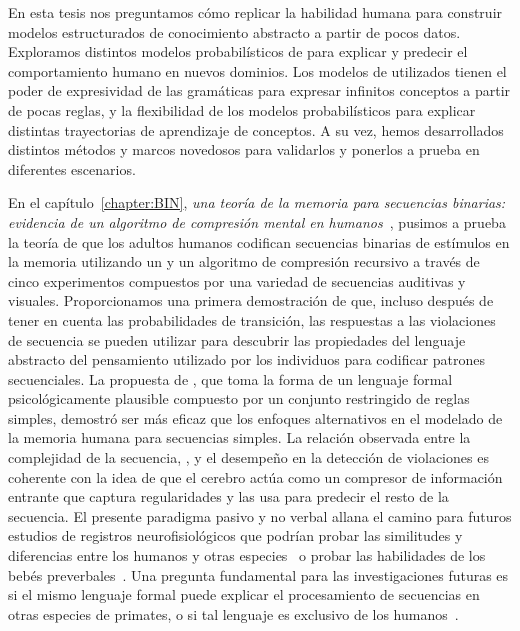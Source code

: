 
En esta tesis nos preguntamos cómo replicar la habilidad humana para construir modelos estructurados de conocimiento abstracto a partir de pocos datos. Exploramos distintos modelos probabilísticos de \lot para explicar y predecir el comportamiento humano en nuevos dominios. Los modelos de \lot utilizados tienen el poder de expresividad de las gramáticas para expresar infinitos conceptos a partir de pocas reglas, y la flexibilidad de los modelos probabilísticos para explicar distintas trayectorias de aprendizaje de conceptos. A su vez, hemos desarrollados distintos métodos y marcos novedosos para validarlos y ponerlos a prueba en diferentes escenarios.

En el capítulo~\ref{chapter:BIN}, \textit{una teoría de la memoria para secuencias binarias: evidencia de un algoritmo de compresión mental en humanos~\cite{planton2021memory}}, pusimos a prueba la teoría de que los adultos humanos codifican secuencias binarias de estímulos en la memoria utilizando un \lot y un algoritmo de compresión recursivo a través de cinco experimentos compuestos por una variedad de secuencias auditivas y visuales. Proporcionamos una primera demostración de que, incluso después de tener en cuenta las probabilidades de transición, las respuestas a las violaciones de secuencia se pueden utilizar para descubrir las propiedades del lenguaje abstracto del pensamiento utilizado por los individuos para codificar patrones secuenciales. La propuesta de \grambin, que toma la forma de un lenguaje formal psicológicamente plausible compuesto por un conjunto restringido de reglas simples, demostró ser más eficaz que los enfoques alternativos en el modelado de la memoria humana para secuencias simples. La relación observada entre la complejidad de la secuencia, \mdlbin, y el desempeño en la detección de violaciones es coherente con la idea de que el cerebro actúa como un compresor de información entrante que captura regularidades y las usa para predecir el resto de la secuencia. El presente paradigma pasivo y no verbal allana el camino para futuros estudios de registros neurofisiológicos que podrían probar las similitudes y diferencias entre los humanos y otras especies~\cite{f13} o probar las habilidades de los bebés preverbales~\cite{f70}. Una pregunta fundamental para las investigaciones futuras es si el mismo lenguaje formal puede explicar el procesamiento de secuencias en otras especies de primates, o si tal lenguaje es exclusivo de los humanos~\cite{f6}.


